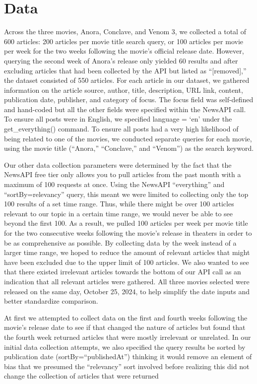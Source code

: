 \documentclass[letterpaper]{article} %
\begin{document}
\section{Data}
Across the three movies, Anora, Conclave, and Venom 3, we collected a total of 600 articles: 200 articles per movie title search query, or 100 articles per movie per week for the two weeks following the movie’s official release date. However, querying the second week of Anora’s release only yielded 60 results and after excluding articles that had been collected by the API but listed as “[removed],” the dataset consisted of 550 articles. For each article in our dataset, we gathered information on the article source, author, title, description, URL link, content, publication date, publisher, and category of focus. The focus field was self-defined and hand-coded but all the other fields were specified within the NewsAPI call. To ensure all posts were in English, we specified language = ‘en’ under the get\_everything() command. To ensure all posts had a very high likelihood of being related to one of the movies, we conducted separate queries for each movie, using the movie title (“Anora,” “Conclave,” and “Venom”) as the search keyword. 

Our other data collection parameters were determined by the fact that the NewsAPI free tier only allows you to pull articles from the past month with a maximum of 100 requests at once. Using the NewsAPI “everything” and “sortBy=relevancy” query, this meant we were limited to collecting only the top 100 results of a set time range. Thus, while there might be over 100 articles relevant to our topic in a certain time range, we would never be able to see beyond the first 100. As a result, we pulled 100 articles per week per movie title for the two consecutive weeks following the movie’s release in theaters in order to be as comprehensive as possible. By collecting data by the week instead of a larger time range, we hoped to reduce the amount of relevant articles that might have been excluded due to the upper limit of 100 articles. We also wanted to see that there existed irrelevant articles towards the bottom of our API call as an indication that all relevant articles were gathered. All three movies selected were released on the same day, October 25, 2024, to help simplify the date inputs and better standardize comparison. 

At first we attempted to collect data on the first and fourth weeks following the movie’s release date to see if that changed the nature of articles but found that the fourth week returned articles that were mostly irrelevant or unrelated. In our initial data collection attempts, we also specified the query results be sorted by publication date (sortBy=“publishedAt”) thinking it would remove an element of bias that we presumed the “relevancy” sort involved before realizing this did not change the collection of articles that were returned
\end{document}

